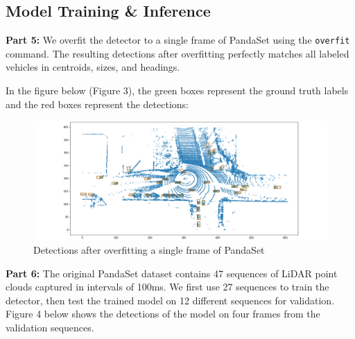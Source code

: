 \documentclass[letter]{article}
\begin{document}
	\subsection{Model Training \& Inference}

	\textbf{Part 5:} We overfit the detector to a single frame of PandaSet using the \verb|overfit| command. The resulting detections after overfitting perfectly matches all labeled vehicles in centroids, sizes, and headings. 

	In the figure below (Figure 3), the green boxes represent the ground truth labels and the red boxes represent the detections:

	\begin{figure}[h]
		\centering
		\includegraphics[width=\linewidth]{images/det_overfit.png}
		\caption{Detections after overfitting a single frame of PandaSet}
		\label{Label}
	\end{figure}

	\pagebreak
	\textbf{Part 6:} The original PandaSet dataset contains 47 sequences of LiDAR point clouds captured in intervals of 100ms. We first use 27 sequences to train the detector, then test the trained model on 12 different sequences for validation. Figure 4 below shows the detections of the model on four frames from the validation sequences.
\end{document}
